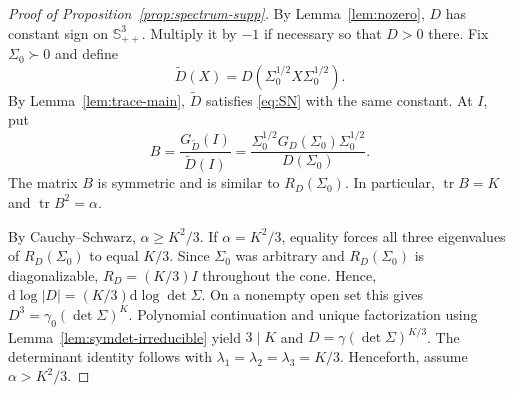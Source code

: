 \documentclass[12pt,a4paper]{article}
\theoremstyle{plain}
\theoremstyle{definition}
\newcommand{\Smat}{\mathbb{S}}
\newcommand{\tr}{\operatorname{tr}}
\begin{document}
\begin{proof}[Proof of Proposition~\ref{prop:spectrum-supp}]
    By Lemma~\ref{lem:nozero}, $D$ has constant sign on $\Smat^3_{++}$.
    Multiply it by $-1$ if necessary so that $D>0$ there.
    Fix $\Sigma_0\succ0$ and define
    \begin{equation*}
        \tilde D(X)
        =
        D(\Sigma_0^{1/2}X\Sigma_0^{1/2})
        .
    \end{equation*}
    By Lemma~\ref{lem:trace-main}, $\tilde D$ satisfies \eqref{eq:SN} with the same constant.
    At $I$, put
    \begin{equation*}
        B
        =
        \frac{G_{\tilde D}(I)}{\tilde D(I)}
        =
        \frac{\Sigma_0^{1/2}G_D(\Sigma_0)\Sigma_0^{1/2}}{D(\Sigma_0)}
        .
    \end{equation*}
    The matrix $B$ is symmetric and is similar to $R_D(\Sigma_0)$.
    In particular, $\tr B=K$ and $\tr B^2=\alpha$.
    
    By Cauchy--Schwarz, $\alpha\ge K^2/3$.
    If $\alpha=K^2/3$, equality forces all three eigenvalues of $R_D(\Sigma_0)$ to equal $K/3$.
    Since $\Sigma_0$ was arbitrary and $R_D(\Sigma_0)$ is diagonalizable, $R_D=(K/3)I$ throughout the cone.
    Hence, $\mathrm{d}\log|D|=(K/3)\mathrm{d}\log\det\Sigma$.
    On a nonempty open set this gives $D^3=\gamma_0(\det\Sigma)^K$.
    Polynomial continuation and unique factorization using Lemma~\ref{lem:symdet-irreducible} yield $3\mid K$ and $D=\gamma(\det\Sigma)^{K/3}$.
    The determinant identity follows with $\lambda_1=\lambda_2=\lambda_3=K/3$.
    Henceforth, assume $\alpha>K^2/3$.
    

\end{proof}
\end{document}
